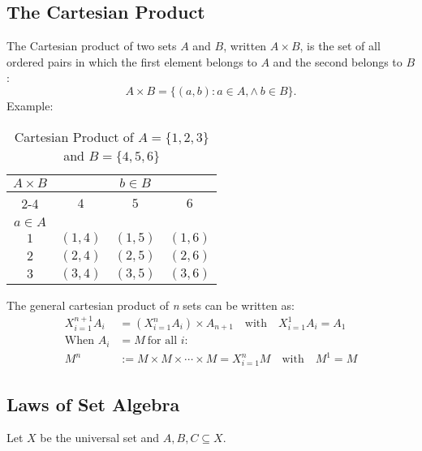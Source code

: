 \subsection{The Cartesian Product}
\smallskip
The Cartesian product of two sets $A$ and $B$, written $A \times B$, is the set of all ordered pairs in which the first element belongs to $A$ and the second belongs to $B$:
\[A \times B = \{ (a, b) : a \in A, \land\ b \in B\}.\]
\smallskip
Example:
\begin{table}[H]
    \centering
    \caption{Cartesian Product of $A = \{1, 2, 3\}$ and $B = \{4, 5, 6\}$}
    \begin{tabular}{|c|c|c|c|}
        \hline
        \multirow{3}{*}{$A \times B$} & \multicolumn{3}{c|}{$b \in B$} \\
        \cline{2-4}
         & $4$ & $5$ & $6$ \\
        \hline
        $a \in A$ & & & \\
        \hline
        $1$ & $(1, 4)$ & $(1, 5)$ & $(1, 6)$ \\
        \hline
        $2$ & $(2, 4)$ & $(2, 5)$ & $(2, 6)$ \\
        \hline
        $3$ & $(3, 4)$ & $(3, 5)$ & $(3, 6)$ \\
        \hline
    \end{tabular}
    \label{tab:cartesian_product}
\end{table}

The general cartesian product of \textit{n} sets can be written as:
\begin{align*}
X_{i = 1}^{n + 1} A_i &= \left( X_{i = 1}^{n} A_i \right) \times A_{n + 1} \quad \text{with} \quad X_{i = 1}^{1} A_i = A_1 \\
\text{When } A_i &= M \ \text{for all } i: \\
M^n &:= M \times M \times \cdots \times M = X_{i = 1}^{n} M \quad \text{with} \quad M^1 = M
\end{align*}

\subsection{Laws of Set Algebra}
Let $X$ be the universal set and $A, B, C \subseteq X$.

